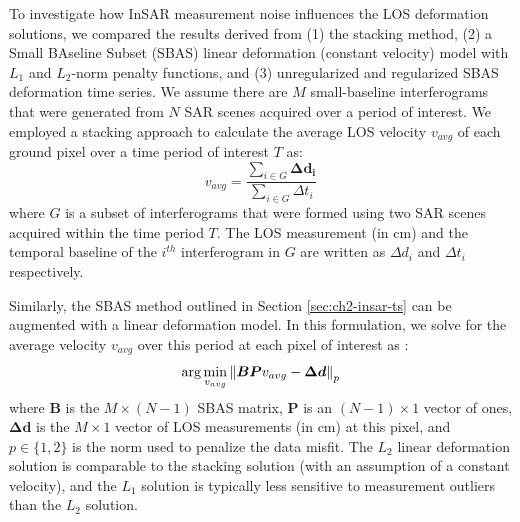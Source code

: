 To investigate how InSAR measurement noise influences the LOS deformation solutions, we compared the results derived from (1) the stacking method, (2) a Small BAseline Subset (SBAS) linear deformation (constant velocity) model with $L_1$ and $L_2$-norm penalty functions, and (3) unregularized and regularized SBAS deformation time series. 
We assume there are $M$ small-baseline interferograms that were generated from $N$ SAR scenes acquired over a period of interest. 
We employed a stacking approach \citep{Sandwell1998PhaseGradientApproach} to calculate the average LOS velocity $v_{avg}$ of each ground pixel over a time period of interest $T$ as:
\begin{equation}
	v_{avg} = \frac{\sum_{i \in G} \bm{\Delta  d_i}}{\sum_{i \in G} \Delta t_i}
	\label{eq:ch4-stacking}
\end{equation}
where $G$ is a subset of interferograms that were formed using two SAR scenes acquired within the time period $T$. The LOS measurement (in cm) and the temporal baseline of the $i^{th}$ interferogram in $G$ are written as $\Delta d_i$ and $ \Delta t_i $ respectively. 


Similarly, the SBAS method outlined in Section \ref{sec:ch2-insar-ts} can be augmented with a linear deformation model.
In this formulation, we solve for the average velocity $ v_{avg} $ over this period at each pixel of interest as \citep{Berardino2002NewAlgorithmSurface}:
\begin{equation}
	\arg \min_{v_{avg}} \left\lVert \bm{BP} v_{avg} - \bm{\Delta d}   \right\rVert_p
	\label{eq:ch4-sbas-linear}
\end{equation}
where $ \bm{B }$ is the $ M \times (N-1) $ SBAS matrix, $ \bm{P}$ is an $ (N-1) \times 1 $ vector of ones, $ \bm{\Delta d} $ is the $ M \times 1 $ vector of LOS measurements (in cm) at this pixel, and $ p \in \{1, 2\} $ is the norm used to penalize the data misfit. The $L_2$ linear deformation solution is comparable to the stacking solution (with an assumption of a constant velocity), and the $L_1$ solution is typically less sensitive to measurement outliers than the $L_2$ solution.

